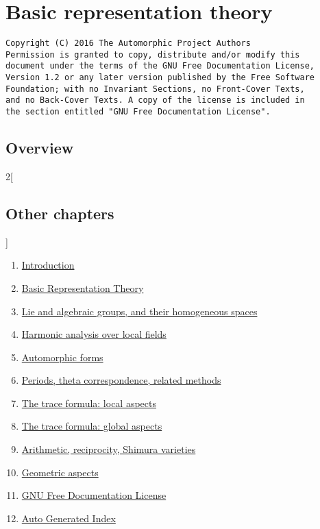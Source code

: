 \documentclass{stacks-project-book}
\theoremstyle{plain}
\theoremstyle{definition}
\theoremstyle{remark}
\numberwithin{equation}{subsection}
\begin{document}
%

\chapter{Basic representation theory}



\label{representationtheory-section-phantom}

\begin{verbatim}
Copyright (C) 2016 The Automorphic Project Authors
Permission is granted to copy, distribute and/or modify this
document under the terms of the GNU Free Documentation License,
Version 1.2 or any later version published by the Free Software
Foundation; with no Invariant Sections, no Front-Cover Texts,
and no Back-Cover Texts. A copy of the license is included in
the section entitled "GNU Free Documentation License".
\end{verbatim}



\section{Overview}
\label{representationtheory-section-overview}




\begin{multicols}{2}[\section{Other chapters}]
\noindent
\begin{enumerate}
\item \hyperref[introduction-section-phantom]{Introduction}
\item \hyperref[representationtheory-section-phantom]{Basic Representation Theory}
\item \hyperref[algebraicgroups-section-phantom]{Lie and algebraic groups, and their homogeneous spaces}
\item \hyperref[harmonicanalysis-section-phantom]{Harmonic analysis over local fields}
\item \hyperref[automorphicforms-section-phantom]{Automorphic forms}
\item \hyperref[periods-section-phantom]{Periods, theta correspondence, related methods}
\item \hyperref[traceformulalocal-section-phantom]{The trace formula: local aspects}
\item \hyperref[traceformulaglobal-section-phantom]{The trace formula: global aspects}
\item \hyperref[arithmetic-section-phantom]{Arithmetic, reciprocity, Shimura varieties}
\item \hyperref[geometric-section-phantom]{Geometric aspects}
\item \hyperref[fdl-section-phantom]{GNU Free Documentation License}
\item \hyperref[index-section-phantom]{Auto Generated Index}
\end{enumerate}
\end{multicols}
\end{document}
